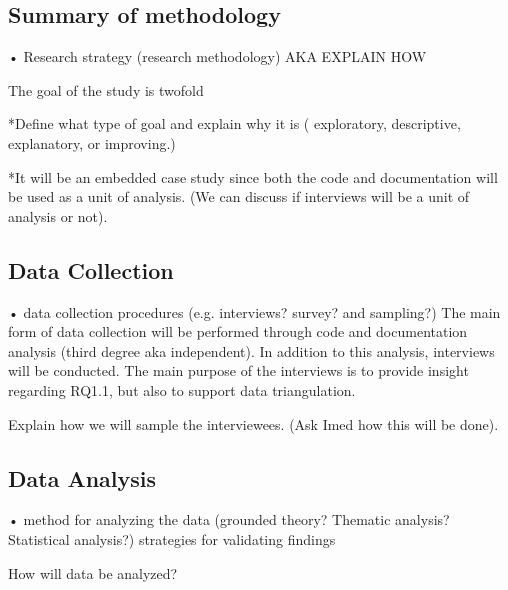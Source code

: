\documentclass[10pt,twocolumn]{article}
\begin{document}
\subsection{Summary of methodology}

• Research strategy (research methodology) 
AKA EXPLAIN HOW

The goal of the study is twofold

*Define what type of goal and explain why it is ( exploratory, descriptive, explanatory, or improving.)

*It will be an embedded case study since both the code and documentation will be used as a unit of analysis. (We can discuss if interviews will be a unit of analysis or not).



\subsection{Data Collection}
• data collection procedures (e.g. interviews? survey? and sampling?) 
The main form of data collection will be performed through code and documentation analysis (third degree aka independent). In addition to this analysis, interviews will be conducted. The main purpose of the interviews is to provide insight regarding RQ1.1, but also to support data triangulation. 

Explain how we will sample the interviewees. (Ask Imed how this will be done).


\subsection{Data Analysis}
• method for analyzing the data (grounded theory? Thematic analysis? Statistical analysis?) strategies for validating findings

How will data be analyzed?










\noindent
\end{document}
